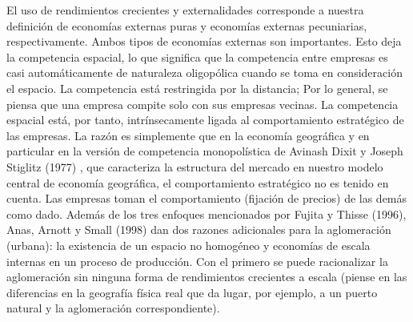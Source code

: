 El uso de rendimientos crecientes y externalidades corresponde a nuestra definición de economías externas puras y economías externas pecuniarias, respectivamente. Ambos tipos de economías externas son importantes. Esto deja la competencia espacial, lo que significa que la competencia entre empresas es casi automáticamente de naturaleza oligopólica cuando se toma en consideración el espacio. La competencia está restringida por la distancia; Por lo general, se piensa que una empresa compite solo con sus empresas vecinas. La competencia espacial está, por tanto, intrínsecamente ligada al comportamiento estratégico de las empresas.  La razón es simplemente que en la economía geográfica y en particular en la versión de competencia monopolística de Avinash Dixit y Joseph Stiglitz (1977) , que caracteriza la estructura del mercado en nuestro modelo central de economía geográfica, el comportamiento estratégico no es tenido en cuenta. Las empresas toman el comportamiento (fijación de precios) de las demás como dado. Además de los tres enfoques mencionados por Fujita y Thisse (1996), Anas, Arnott y Small (1998) dan dos razones adicionales para la aglomeración (urbana): la existencia de un espacio no homogéneo y economías de escala internas en un proceso de producción. Con el primero se puede racionalizar la aglomeración sin ninguna forma de rendimientos crecientes a escala (piense en las diferencias en la geografía física real que da lugar, por ejemplo, a un puerto natural y la aglomeración correspondiente). 

